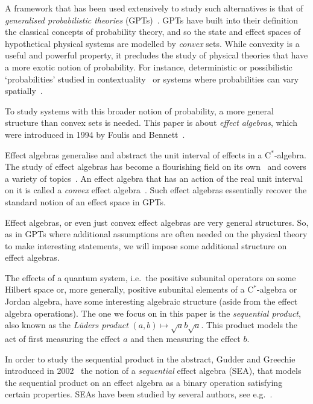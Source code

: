 \documentclass[a4paper, onecolumn, accepted=2020-12-22]{quantumarticle}
\theoremstyle{definition}
\begin{document}
A framework that has been used extensively to study such alternatives is that of \emph{generalised probabilistic theories} (GPTs)~\cite{barrett2007information}. GPTs have built into their definition the classical concepts of probability theory, and so the state and effect spaces of hypothetical physical systems are modelled by \emph{convex} sets.
While convexity is a useful and powerful property, it precludes the study of physical theories that have a more exotic notion of probability. For instance, deterministic or possibilistic `probabilities' studied in contextuality~\cite{abramsky2011sheaf,santos2020possibilistic} or systems where probabilities can vary spatially~\cite{moliner2017space}.


To study systems with this broader notion of probability, a more general structure than convex sets is needed.
This paper is about \emph{effect algebras}, which were introduced in 1994 by Foulis and Bennett~\cite{foulis1994effect}.

Effect algebras generalise and abstract the unit interval of effects in a C$^*$-algebra.
The study of effect algebras has become a flourishing field on its own~\cite{gudder1996examples,gudder1996effect,chajda2009every,ravindran1997structure,jenvca2001blocks,dvurevcenskij2010every,foulis2010type} 
    and covers a variety of topics~\cite{staton2018effect,roumen2016cohomology,jacobs2015effect,Jencova2019propertiesof}.
An effect algebra that has an action of the real unit interval on it is called a \emph{convex} effect algebra~\cite{gudder1999convex}. Such effect algebras essentially recover the standard notion of an effect space in GPTs.

Effect algebras, or even just convex effect algebras are very general structures. So, as in GPTs where additional assumptions are often needed on the physical theory to make interesting statements, we will impose some additional structure on effect algebras.

The effects of a quantum system, i.e.~the positive subunital operators on some Hilbert space or, more generally, positive subunital elements of a C$^*$-algebra or Jordan algebra, have some interesting algebraic structure
(aside from the effect algebra operations). The one we focus on in this paper is the \emph{sequential product}, also known as the \emph{L\"uders product} $(a,b)\mapsto \sqrt{a}b\sqrt{a}$. This product models the act of first measuring the effect $a$ and then measuring the effect $b$.

In order to study the sequential product in the abstract, Gudder and Greechie introduced in 2002~\cite{gudder2002sequential} the notion of a \emph{sequential} effect algebra (SEA), that models the sequential product on an effect algebra as a binary operation satisfying certain properties.
SEAs have been studied by several authors,
    see e.g.~\cite{gudder2005open,gudder2005uniqueness,gudder2008characterization,jun2009remarks,wetering2018characterisation,wetering2018sequential,shen2009not,giski2015entropy,giski2017introduction,jun2009sequential,tkadlec2008atomic,habil2008tensor,basmaster,weihua2009uniqueness}.
\end{document}
